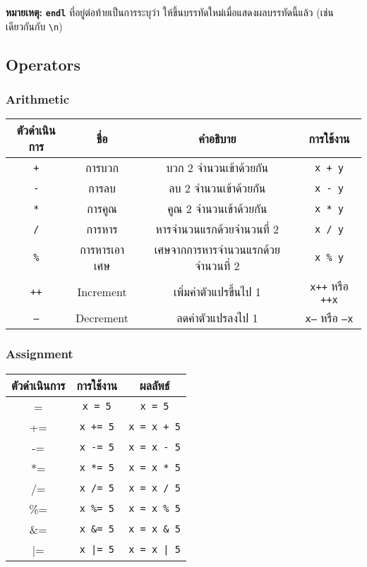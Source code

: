 \noindent\textbf{หมายเหตุ:} \textbf{\texttt{endl}} ที่อยู่ต่อท้ายเป็นการระบุว่า ให้ขึ้นบรรทัดใหม่เมื่อแสดงผลบรรทัดนี้แล้ว (เช่นเดียวกันกับ \texttt{\textbackslash n})

\newpage
\subsection{Operators}
\subsubsection{Arithmetic}
\begin{center}
\begin{tabular}{||c|c|c|c||}
\hline
\textbf{ตัวดำเนินการ} & \textbf{ชื่อ} & \textbf{คำอธิบาย} & \textbf{การใช้งาน} \\
\hline
\texttt{+} & การบวก & บวก 2 จำนวนเข้าด้วยกัน & \texttt{x + y} \\
\texttt{-} & การลบ & ลบ 2 จำนวนเข้าด้วยกัน & \texttt{x - y} \\
\texttt{*} & การคูณ & คูณ 2 จำนวนเข้าด้วยกัน & \texttt{x * y} \\
\texttt{/} & การหาร & หารจำนวนแรกด้วยจำนวนที่ 2 & \texttt{x / y} \\
\texttt{\%} & การหารเอาเศษ & เศษจากการหารจำนวนแรกด้วยจำนวนที่ 2 & \texttt{x \% y} \\
\texttt{++} & Increment & เพิ่มค่าตัวแปรขึ้นไป 1 & \texttt{x++} หรือ \texttt{++x} \\
\texttt{--} & Decrement & ลดค่าตัวแปรลงไป 1 & \texttt{x--} หรือ \texttt{--x} \\
\hline
\end{tabular}
\end{center}
\subsubsection{Assignment}
\begin{center}
\begin{tabular}{||c|c|c||}
\hline
\textbf{ตัวดำเนินการ} & \textbf{การใช้งาน} & \textbf{ผลลัพธ์} \\
\hline
= & \texttt{x = 5} & \texttt{x = 5} \\
+= & \texttt{x += 5} & \texttt{x = x + 5} \\
-= & \texttt{x -= 5} & \texttt{x = x - 5} \\
*= & \texttt{x *= 5} & \texttt{x = x * 5} \\
/= & \texttt{x /= 5} & \texttt{x = x / 5} \\
\%= & \texttt{x \%= 5} & \texttt{x = x \% 5} \\
\&= & \texttt{x \&= 5} & \texttt{x = x \& 5} \\
|= & \texttt{x |= 5} & \texttt{x = x | 5} \\
\hline
\end{tabular}
\end{center}
